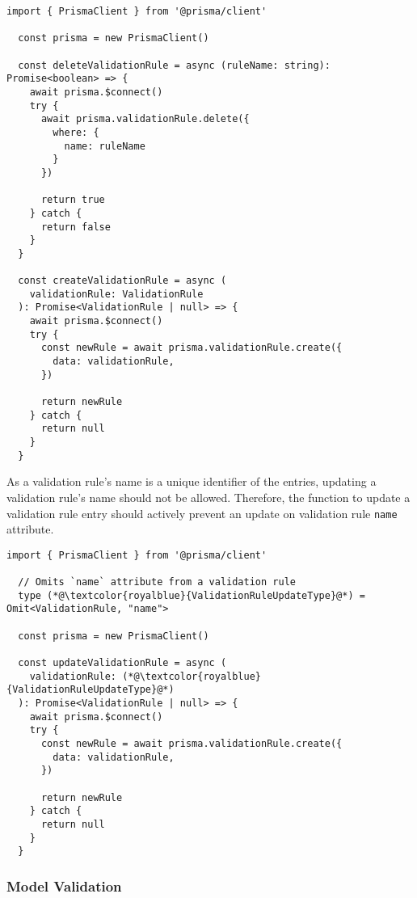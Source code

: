   \begin{lstlisting}[style=es6, caption={Creating a new validation rule and deleting an existing entry based on its name (TypeScript)}]
  import { PrismaClient } from '@prisma/client'

  const prisma = new PrismaClient()

  const deleteValidationRule = async (ruleName: string): Promise<boolean> => {
    await prisma.$connect()
    try {
      await prisma.validationRule.delete({
        where: {
          name: ruleName
        }
      })

      return true
    } catch {
      return false
    }
  }
  
  const createValidationRule = async (
    validationRule: ValidationRule
  ): Promise<ValidationRule | null> => {
    await prisma.$connect()
    try {
      const newRule = await prisma.validationRule.create({
        data: validationRule,
      })
  
      return newRule
    } catch {
      return null
    }
  }
  \end{lstlisting}  

  As a validation rule's name is a unique identifier of the entries, updating a validation rule's name should not be allowed. Therefore, the function to update a validation rule entry should actively prevent an update on validation rule \verb;name; attribute. 

  \begin{lstlisting}[style=es6, caption={Getting an existing validation rule based on its name in the database (TypeScript)}]
  import { PrismaClient } from '@prisma/client'

  // Omits `name` attribute from a validation rule
  type (*@\textcolor{royalblue}{ValidationRuleUpdateType}@*) = Omit<ValidationRule, "name"> 

  const prisma = new PrismaClient()
  
  const updateValidationRule = async (
    validationRule: (*@\textcolor{royalblue}{ValidationRuleUpdateType}@*)
  ): Promise<ValidationRule | null> => {
    await prisma.$connect()
    try {
      const newRule = await prisma.validationRule.create({
        data: validationRule,
      })
  
      return newRule
    } catch {
      return null
    }
  }
  \end{lstlisting}  

 \subsubsection{Model Validation}